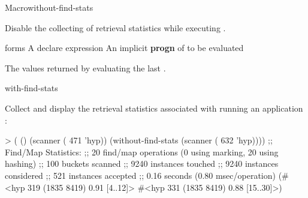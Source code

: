 \documentclass[10pt,twoside,english,pdftex]{article}
\begin{document}

\begin{functiondoc}{Macro}{without-find-stats}%
  {\superstar{}
    \superstar{}
    \returns{} \superstar} 
%
%
%
  
\fnsyntax

\fnpurpose 
{}%
%
Disable the collecting of retrieval statistics while executing .

\fnpackage {}

\fnmodule {}

\fnargs
\begin{args}{forms}
\arg[declaration] A declare expression
\arg[forms] An implicit \textbf{progn} of  to be evaluated
\end{args}

\fnreturns The values returned by evaluating the last .

\begin{alsos}{with-find-stats}
\end{alsos}

\fnexample
{}%
%
Collect and display the retrieval statistics associated with
running an application  :
%
\W\supp
\begin{example}
> ( ()
     (scanner ( 471 'hyp))
     (without-find-stats
        (scanner ( 632 'hyp))))
;; Find/Map Statistics:
;;        20 find/map operations (0 using marking, 20 using hashing)
;;       100 buckets scanned
;;      9240 instances touched
;;      9240 instances considered
;;       521 instances accepted
;;      0.16 seconds (0.80 msec/operation)
(#<hyp 319 (1835 8419) 0.91 [4..12]>
 #<hyp 331 (1835 8419) 0.88 [15..30]>)
\end{example}

\end{functiondoc}


\T\markright{}%
\T\pagestyle{plain}
\T\clearpage
\W{}
\T\pagestyle{fancy}
\T\thispagestyle{fancybottom}
\T\global\def\fnlastname{ }%
\end{document}
